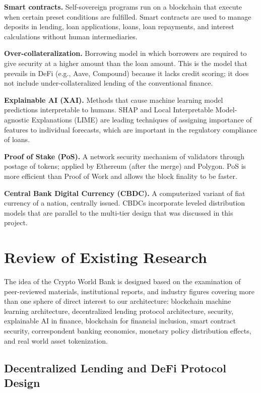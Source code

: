 \documentclass[12pt,a4paper]{report}
\begin{document}
\hangindent=0.5in \textbf{Smart contracts.} Self-sovereign programs run on a blockchain that execute when certain preset conditions are fulfilled. Smart contracts are used to manage deposits in lending, loan applications, loans, loan repayments, and interest calculations without human intermediaries.

\hangindent=0.5in \textbf{Over-collateralization.} Borrowing model in which borrowers are required to give security at a higher amount than the loan amount. This is the model that prevails in DeFi (e.g., Aave, Compound) because it lacks credit scoring; it does not include under-collateralized lending of the conventional finance.

\hangindent=0.5in \textbf{Explainable AI (XAI).} Methods that cause machine learning model predictions interpretable to humans. SHAP and Local Interpretable Model-agnostic Explanations (LIME) are leading techniques of assigning importance of features to individual forecasts, which are important in the regulatory compliance of loans.

\hangindent=0.5in \textbf{Proof of Stake (PoS).} A network security mechanism of validators through postage of tokens; applied by Ethereum (after the merge) and Polygon. PoS is more efficient than Proof of Work and allows the block finality to be faster.

\hangindent=0.5in \textbf{Central Bank Digital Currency (CBDC).} A computerized variant of fiat currency of a nation, centrally issued. CBDCs incorporate leveled distribution models that are parallel to the multi-tier design that was discussed in this project.

\section{Review of Existing Research}

The idea of the Crypto World Bank is designed based on the examination of peer-reviewed materials, institutional reports, and industry figures covering more than one sphere of direct interest to our architecture: blockchain machine learning architecture, decentralized lending protocol architecture, security, explainable AI in finance, blockchain for financial inclusion, smart contract security, correspondent banking economics, monetary policy distribution effects, and real world asset tokenization.

\subsection{Decentralized Lending and DeFi Protocol Design}
\end{document}
